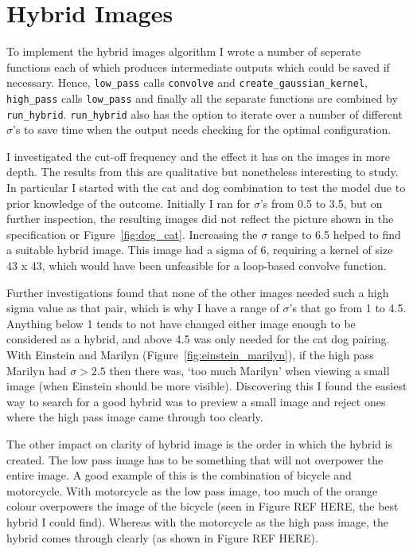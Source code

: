 \documentclass[a4paper,10pt]{article}
\begin{document}
\section{Hybrid Images}
To implement the hybrid images algorithm I wrote a number of seperate
functions each of which produces intermediate outputs which could be
saved if necessary. Hence, \lstinline|low_pass| calls \lstinline|convolve| and
\lstinline|create_gaussian_kernel|, \lstinline|high_pass| calls \lstinline|low_pass|
and finally all the separate functions are combined by \lstinline|run_hybrid|.
\lstinline|run_hybrid| also has the option to iterate over a number of different
$\sigma$'s to save time when the output needs checking for the optimal
configuration.

I investigated the cut-off frequency and the effect it has on the images in more
depth. The results from this are qualitative but nonetheless
interesting to study. In particular I started with the cat and dog combination
to test the model due to prior knowledge of the outcome. Initially I ran for $\sigma$'s
from 0.5 to 3.5, but on further inspection, the resulting images did not
reflect the picture shown in the specification or Figure~\ref{fig:dog_cat}.
Increasing the $\sigma$ range to 6.5 helped to find a suitable hybrid image.
This image had a sigma of 6, requiring a kernel of size 43 x 43, which would
have been unfeasible for a loop-based convolve function.

Further investigations found that none of the other images needed
such a high sigma value as that pair, which is why I have a range of $\sigma$'s
that go from 1 to 4.5. Anything below 1 tends to not have changed either image
enough to be considered as a hybrid, and above 4.5 was only needed for the cat
dog pairing. With Einstein and Marilyn (Figure~\ref{fig:einstein_marilyn}), if
the high pass Marilyn had $\sigma > 2.5$ then there was, `too much
Marilyn' when viewing a small image (when Einstein should be more visible).
Discovering this I found the easiest way to search for a good hybrid was to
preview a small image and reject ones where the high pass image came through too
clearly.

The other impact on clarity of hybrid image is the order in which the hybrid is
created. The low pass image has to be something that will not overpower the
entire image. A good example of this is the combination of bicycle and motorcycle.
With motorcycle as the low pass image, too much of the orange colour overpowers
the image of the bicycle (seen in Figure REF HERE, the best hybrid I could find).
Whereas with the motorcycle as the high pass image, the hybrid comes through
clearly (as shown in Figure REF HERE).
\end{document}
